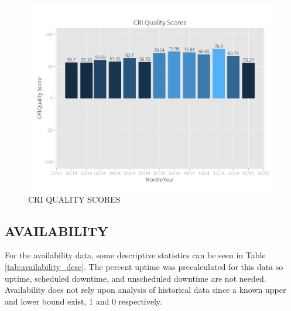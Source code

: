 \documentclass[SDSUThesis.tex]{subfiles}
\begin{document}
        \begin{figure}[ht]
            \centering
            \includegraphics[scale=.3]{images/quality_scores.png}
            \caption{CRI QUALITY SCORES}
            \label{fig:quality-scores}
        \end{figure}
        
        
        
        
    \subsection{AVAILABILITY}
        For the availability data,
        some descriptive statistics can be seen in 
        Table \ref{tab:availability_desc}.  The percent uptime
        was precalculated for this data so uptime, scheduled downtime,
        and unscheduled downtime are not needed.  Availability
        does not rely upon analysis of historical data since
        a known upper and lower bound exist, 1 and 0 respectively.
        
\end{document}
